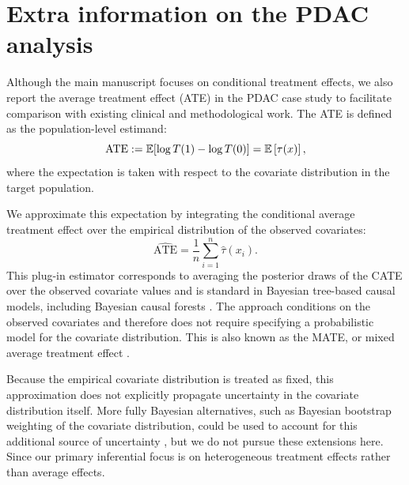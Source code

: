 \section{Extra information on the PDAC analysis}
\label{appendix:clinical_covariates}
\raggedbottom


Although the main manuscript focuses on conditional treatment effects, we also report the average treatment effect (ATE) in the PDAC case study to facilitate comparison with existing clinical and methodological work. 
The ATE is defined as the population-level estimand:
\begin{equation}
\mathrm{ATE} := \mathbb{E}\!\left[\log T(1) - \log T(0)\right] = \mathbb{E}\left[\tau(x)\right],
\end{equation}
where the expectation is taken with respect to the covariate distribution in the target population.



We approximate this expectation by integrating the conditional average treatment effect over the empirical distribution of the observed covariates:
\begin{equation}
\widehat{\mathrm{ATE}}
= \frac{1}{n}\sum_{i=1}^n\widehat{\tau}(x_i).
\end{equation}
This plug-in estimator corresponds to averaging the posterior draws of the CATE over the observed covariate values and is standard in Bayesian tree-based causal models, including Bayesian causal
forests \citep{hahn2020bayesian}. 
The approach conditions on the observed covariates and therefore does not require specifying a probabilistic model for the covariate distribution.
This is also known as the MATE, or mixed average treatment effect \citep{Li2023BayesianCausal}.


Because the empirical covariate distribution is treated as fixed, this approximation does not explicitly propagate uncertainty in the covariate distribution itself.
More fully Bayesian alternatives, such as Bayesian bootstrap weighting of the covariate distribution, could be used to account for this additional source of uncertainty \citep{Oganisian2025Untangling}, but we do not
pursue these extensions here. 
Since our primary inferential focus is on heterogeneous treatment effects rather than average effects.






